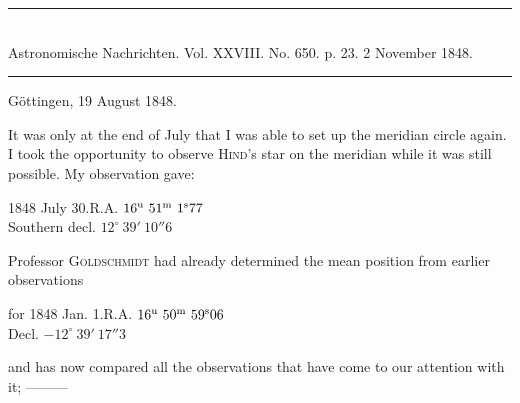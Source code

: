 \clearpage
{}
\begin{center}
\rule{0.55\linewidth}{0.4pt}\\[2pt]
Astronomische Nachrichten. Vol. XXVIII. No. 650. p. 23. 2 November 1848.\\[2pt]
\rule{0.55\linewidth}{0.4pt}
\end{center}
\begin{flushright}Göttingen, 19 August 1848.\end{flushright}

It was only at the end of July that I was able to set up the meridian circle again. I took the opportunity to observe \textsc{Hind}’s star on the meridian while it was still possible. My observation gave:

\begin{center}
1848 July 30.\quad R.A. $16^{\rm u}\ 51^{\rm m}\ 1^{\rm s}77$\\
Southern decl. $12^\circ\ 39'\ 10''6$
\end{center}

Professor \textsc{Goldschmidt} had already determined the mean position from earlier observations

\begin{center}
for 1848 Jan. 1.\quad R.A. $16^{\rm u}\ 50^{\rm m}\ 59^{\rm s}06$\\
Decl. $-12^\circ\ 39'\ 17''3$
\end{center}

and has now compared all the observations that have come to our attention with it; \mbox{---\quad---\quad---}

